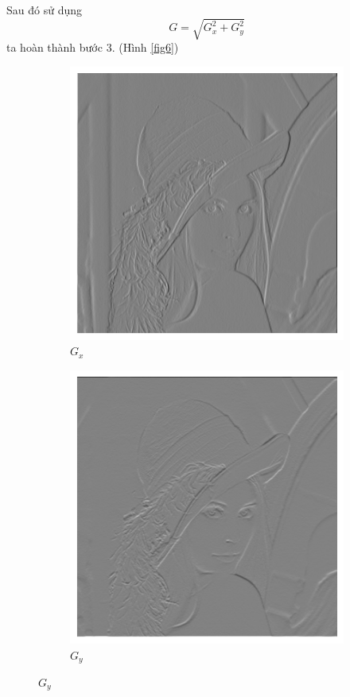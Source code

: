 \documentclass{article}
\begin{document}
    Sau đó sử dụng $$G = \sqrt{G_x^{2}+G_y^{2}}$$ ta hoàn thành bước 3. (Hình \ref{fig6})\\
    \begin{figure}[ht!]
        \centering
        \begin{subfigure}[b]{0.4\linewidth}
        \includegraphics[width = \linewidth]{gx.png}
        \caption{$G_x$}
        
        \end{subfigure}
        \begin{subfigure}[b]{0.4\linewidth}
        \includegraphics[width = \linewidth]{gy.png}
        \caption{$G_y$}
        

\end{subfigure}
\end{figure}
\end{document}
